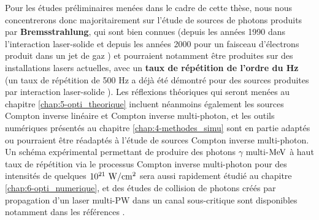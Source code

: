 \begin{refsection}
Pour les études préliminaires menées dans le cadre de cette thèse, nous nous concentrerons donc majoritairement sur l'étude de sources de photons produits par \textbf{Bremsstrahlung}, qui sont bien connues (depuis les années 1990 dans l'interaction laser-solide \parencite{kmetec_1992} et depuis les années 2000 pour un faisceau d'électrons produit dans un jet de gaz \parencite{edwards_2002}) et pourraient notamment être produites sur des installations lasers actuelles, avec un \textbf{taux de répétition de l'ordre du Hz} (un taux de répétition de 500 Hz a déjà été démontré pour des sources produites par interaction laser-solide \parencite{zulick_2013}). Les réflexions théoriques qui seront menées au chapitre \ref{chap:5-opti_theorique} incluent néanmoins également les sources Compton inverse linéaire et Compton inverse multi-photon, et les outils numériques présentés au chapitre \ref{chap:4-methodes_simu} sont en partie adaptés ou pourraient être réadaptés à l'étude de sources Compton inverse multi-photon. Un schéma expérimental permettant de produire des photons $\gamma$ multi-$\rm MeV$ à haut taux de répétition via le processus Compton inverse multi-photon pour des intensités de quelques $10^{21} ~ \rm W/cm^2$ sera aussi rapidement étudié au chapitre \ref{chap:6-opti_numerique}, et des études de collision de photons créés par propagation d'un laser multi-PW dans un canal sous-critique sont disponibles notamment dans les références \parencite{jansen_2018a, wang_2020}.


\end{refsection}
